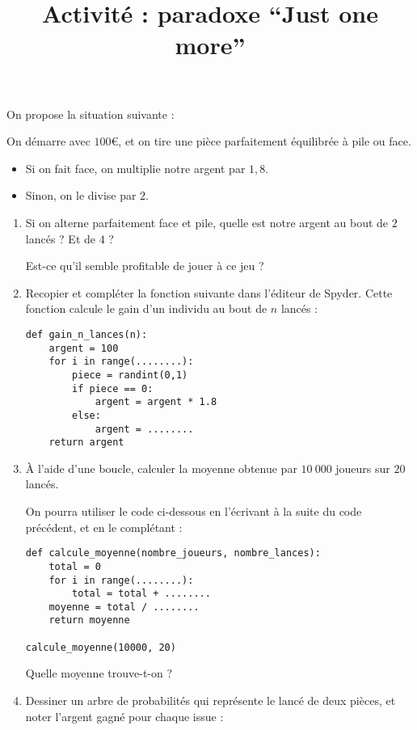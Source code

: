 \documentclass[
	classe=$1^{ere}STI2D$
]{informatique}
\title{Activité : paradoxe “Just one more”}
\begin{document}
\maketitle

\begin{tcolorbox}
	On propose la situation suivante :

	On démarre avec $100$€, et on tire une pièce parfaitement équilibrée à pile ou face.
	\begin{itemize}
		\item Si on fait face, on multiplie notre argent par $1,8$.
		\item Sinon, on le divise par $2$.
	\end{itemize}
\end{tcolorbox}

\begin{enumerate}
	\item Si on alterne parfaitement face et pile, quelle est notre argent au bout de $2$ lancés ? Et de $4$ ?


	      Est-ce qu'il semble profitable de jouer à ce jeu ? 
	\item Recopier et compléter la fonction suivante dans l'éditeur de Spyder. Cette fonction calcule le gain d'un individu au bout de $n$ lancés :

	      \begin{lstlisting}
def gain_n_lances(n):
	argent = 100
	for i in range(........):
		piece = randint(0,1)
		if piece == 0:
			argent = argent * 1.8
		else:
			argent = ........
	return argent
\end{lstlisting}
	\item À l'aide d'une boucle, calculer la moyenne obtenue par $10\ 000$ joueurs sur $20$ lancés.

	      On pourra utiliser le code ci-dessous en l'écrivant à la suite du code précédent, et en le complétant :
	      \begin{lstlisting}
def calcule_moyenne(nombre_joueurs, nombre_lances):
	total = 0
	for i in range(........):
		total = total + ........
	moyenne = total / ........
	return moyenne

calcule_moyenne(10000, 20)
\end{lstlisting}

	      Quelle moyenne trouve-t-on ? 
	\item Dessiner un arbre de probabilités qui représente le lancé de deux pièces, et noter l'argent gagné pour chaque issue :


\end{enumerate}
\end{document}
